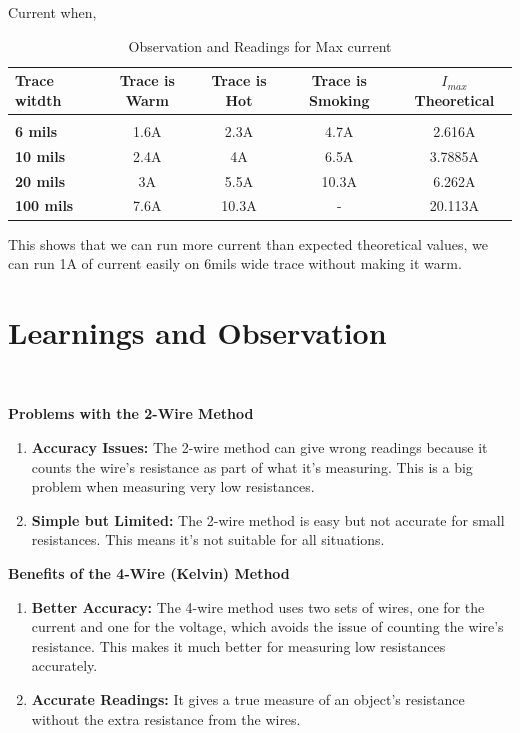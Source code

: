 \documentclass[a4paper,11pt]{article}%
\begin{document}
	Current when,
\begin{table}[H]
	\centering 
	\begin{tabular}{| l | c | c | c | c |}
		\hline
		\textbf{Trace witdth}&\textbf{Trace is Warm}&\textbf{Trace is Hot}&\textbf{Trace is Smoking}&\textbf{ $I_{max}$ Theoretical}\\\hline
		&&&&\\
\textbf{6 mils}&1.6A&2.3A&4.7A&2.616A\\
\textbf{10 mils}&2.4A&4A&6.5A&3.7885A\\
\textbf{20 mils}&3A&5.5A&10.3A&6.262A\\
\textbf{100 mils}&7.6A&10.3A&-&20.113A\\


\hline\hline
	\end{tabular}
	\caption{Observation and Readings for Max current}

\end{table}

This shows that we can run more current than expected theoretical values, we can run 1A of current easily on 6mils wide trace without making it warm.

\section{Learnings and Observation}\

\textbf{Problems with the 2-Wire Method}
\begin{enumerate}
	\item \textbf{Accuracy Issues:} The 2-wire method can give wrong readings because it counts the wire's resistance as part of what it's measuring. This is a big problem when measuring very low resistances.
	\item \textbf{Simple but Limited:} The 2-wire method is easy but not accurate for small resistances. This means it's not suitable for all situations.
\end{enumerate}

\textbf{Benefits of the 4-Wire (Kelvin) Method}
\begin{enumerate}
	\item \textbf{Better Accuracy:} The 4-wire method uses two sets of wires, one for the current and one for the voltage, which avoids the issue of counting the wire's resistance. This makes it much better for measuring low resistances accurately.
	\item \textbf{Accurate Readings:} It gives a true measure of an object's resistance without the extra resistance from the wires.
	
\end{enumerate}
\end{document}
